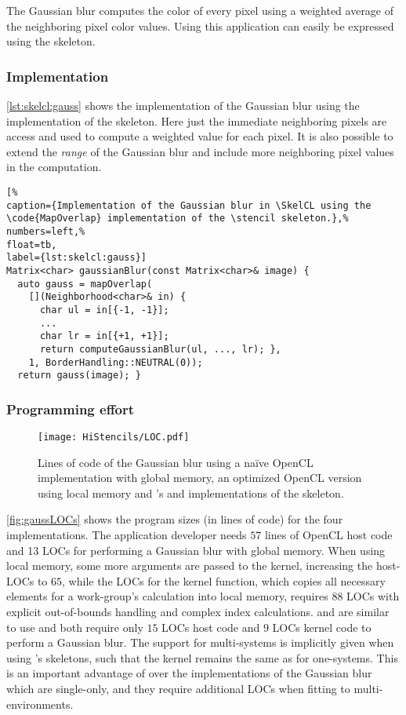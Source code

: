 The Gaussian blur computes the color of every pixel using a weighted average of the neighboring pixel color values.
Using \SkelCL this application can easily be expressed using the \stencil skeleton.

\subsubsection*{\SkelCL Implementation}
\autoref{lst:skelcl:gauss} shows the implementation of the Gaussian blur using the  implementation of the \stencil skeleton.
Here just the immediate neighboring pixels are access and used to compute a weighted value for each pixel.
It is also possible to extend the \emph{range} of the Gaussian blur and include more neighboring pixel values in the computation.

\begin{lstlisting}[%                                                             
caption={Implementation of the Gaussian blur in \SkelCL using the \code{MapOverlap} implementation of the \stencil skeleton.},%
numbers=left,%
float=tb,
label={lst:skelcl:gauss}]
Matrix<char> gaussianBlur(const Matrix<char>& image) {
  auto gauss = mapOverlap(
    [](Neighborhood<char>& in) {
      char ul = in[{-1, -1}];
      ...
      char lr = in[{+1, +1}];
      return computeGaussianBlur(ul, ..., lr); },
    1, BorderHandling::NEUTRAL(0));
  return gauss(image); }
\end{lstlisting}

\subsubsection*{Programming effort}

\begin{figure}[tbp]
	\centering
	\texttt{[image: HiStencils/LOC.pdf]}
	\caption{Lines of code of the Gaussian blur using a na{\"i}ve OpenCL implementation with global memory, an optimized OpenCL version using local memory and \SkelCL's  and  implementations of the \stencil skeleton.}
	\label{fig:gaussLOCs}
\end{figure} 

\autoref{fig:gaussLOCs} shows the program sizes (in lines of code) for the four implementations. 
The application developer needs $57$ lines of OpenCL host code and 13 LOCs for performing a Gaussian blur with global memory. 
When using local memory, some more arguments are passed to the kernel, increasing the host-LOCs to $65$, while the LOCs for the kernel function, which copies all necessary elements for a work-group's calculation into local memory, requires $88$ LOCs with explicit out-of-bounds handling and complex index calculations.
 and  are similar to use and both require only $15$ LOCs host code and $9$ LOCs kernel code to perform a Gaussian blur. 
The support for multi-\GPU systems is implicitly given when using \SkelCL's skeletons, such that the kernel remains the same as for one-\GPU systems.
This is an important advantage of \SkelCL over the \OpenCL implementations of the Gaussian blur which are single-\GPU only, and they require additional LOCs when fitting to multi-\GPU environments.

